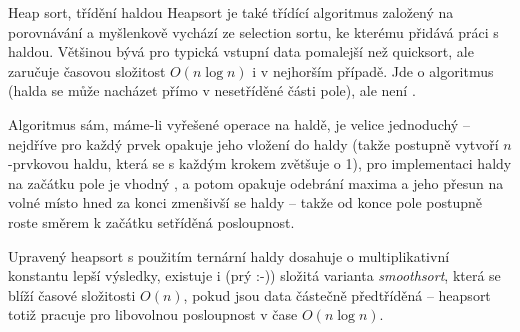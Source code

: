 \begin{algoritmusN}{Heap sort, třídění haldou}
Heapsort je také třídící algoritmus založený na porovnávání a myšlenkově vychází ze selection sortu, ke kterému přidává práci s haldou. Většinou bývá pro typická vstupní data pomalejší než quicksort, ale zaručuje časovou složitost $O(n\log n)$ i v nejhorším případě. Jde o  algoritmus (halda se může nacházet přímo v nesetříděné části pole), ale není .

Algoritmus sám, máme-li vyřešené operace na haldě, je velice jednoduchý -- nejdříve pro každý prvek opakuje jeho vložení do haldy (takže postupně vytvoří $n$-prvkovou haldu, která se s každým krokem zvětšuje o 1), pro implementaci haldy na začátku pole je vhodný , a potom opakuje odebrání maxima a jeho přesun na volné místo hned za konci zmenšivší se haldy -- takže od konce pole postupně roste směrem k začátku setříděná posloupnost.

Upravený heapsort s použitím ternární haldy dosahuje o multiplikativní konstantu lepší výsledky, existuje i (prý :-)) složitá varianta \emph{smoothsort}, která se blíží časové složitosti $O(n)$, pokud jsou data částečně předtříděná -- heapsort totiž pracuje pro libovolnou posloupnost v čase $O(n\log n)$.
\end{algoritmusN}

